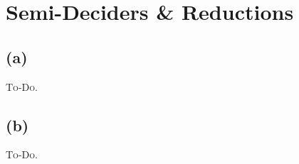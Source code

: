 



\section{Semi-Deciders \& Reductions}

\subsection{(a)}

\textsc{To-Do.}

\subsection{(b)}

\textsc{To-Do.}


